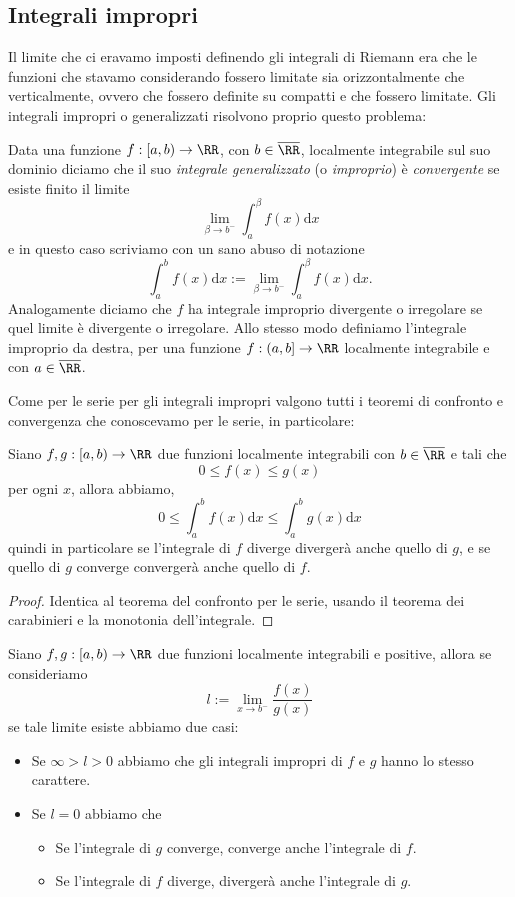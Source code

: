 \documentclass[11pt]{scrartcl}
\newcommand{\dif}{\text{d}}
\begin{document}
	\newpage
	
	\subsection{Integrali impropri}
	
	Il limite che ci eravamo imposti definendo gli integrali di Riemann era che le funzioni che stavamo considerando fossero limitate sia orizzontalmente che verticalmente, ovvero che fossero definite su compatti e che fossero limitate. Gli integrali impropri o generalizzati risolvono proprio questo problema:
	\begin{definition}
		Data una funzione $f:[a,b)\to\RR$, con $b\in \overline{\RR}$, localmente integrabile sul suo dominio diciamo che il suo \textit{integrale generalizzato} (o \textit{improprio}) è \textit{convergente} se esiste finito il limite
		$$\lim_{\beta\to b^-}\int_a^\beta f(x)\dif x$$
		e in questo caso scriviamo con un sano abuso di notazione
		$$\int_a^bf(x)\dif x:=\lim_{\beta\to b^-}\int_a^\beta f(x)\dif x.$$
		Analogamente diciamo che $f$ ha integrale improprio divergente o irregolare se quel limite è divergente o irregolare. Allo stesso modo definiamo l'integrale improprio da destra, per una funzione $f:(a,b]\to \RR$ localmente integrabile e con $a\in \overline{\RR}$.
	\end{definition}
	Come per le serie per gli integrali impropri valgono tutti i teoremi di confronto e convergenza che conoscevamo per le serie, in particolare:
	\begin{proposition}
		Siano $f,g:[a,b)\to\RR$ due funzioni localmente integrabili con $b\in\overline{\RR}$ e tali che
		$$0\le f(x)\le g(x)$$
		per ogni $x$, allora abbiamo,
		$$0\le \int_a^b f(x)\dif x\le \int_a^b g(x)\dif x$$
		quindi in particolare se l'integrale di $f$ diverge divergerà anche quello di $g$, e se quello di $g$ converge convergerà anche quello di $f$.
	\end{proposition}
	\begin{proof}
		Identica al teorema del confronto per le serie, usando il teorema dei carabinieri e la monotonia dell'integrale.
	\end{proof}
	\begin{proposition}
		Siano $f,g:[a,b)\to\RR$ due funzioni localmente integrabili e positive, allora se consideriamo
		$$l:=\lim_{x\to b^-}\frac{f(x)}{g(x)}$$
		se tale limite esiste abbiamo due casi:
		\begin{itemize}
			\item Se $\infty>l>0$ abbiamo che gli integrali impropri di $f$ e $g$ hanno lo stesso carattere.
			\item Se $l=0$ abbiamo che
			\begin{itemize}
				\item Se l'integrale di $g$ converge, converge anche l'integrale di $f$.
				\item Se l'integrale di $f$ diverge, divergerà anche l'integrale di $g$.
			\end{itemize}
		\end{itemize}
	\end{proposition}
\end{document}
